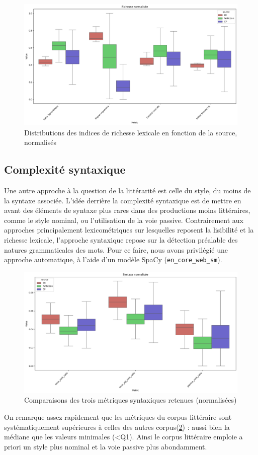 \documentclass[12pt,a4paper,oneside,titlepage]{book} %
\begin{document}
\begin{figure}
    \centering
    \includegraphics[width=0.5\linewidth]{illustration/richness _norm.png}
    \caption{Distributions des indices de richesse lexicale en fonction de la source, normalisés}
    \label{fig:richness_norm}
\end{figure}



\subsection{Complexité syntaxique}

Une autre approche à la question de la littérarité est celle du style, du moins de la syntaxe associée. L'idée derrière la complexité syntaxique est de mettre en avant des éléments de syntaxe plus rares dans des productions moins littéraires, comme le style nominal, ou l'utilisation de la voie passive. 
Contrairement aux approches principalement lexicométriques sur lesquelles reposent la lisibilité et la richesse lexicale, l'approche syntaxique repose sur la détection préalable des natures grammaticales des mots. Pour ce faire, nous avons privilégié une approche automatique, à l'aide d'un modèle SpaCy (\texttt{en\_core\_web\_sm}). 

\begin{figure}
    \centering
    \includegraphics[width=0.5\linewidth]{illustration/synt_norm.png}
    \caption{Comparaisons des trois métriques syntaxiques retenues (normalisées)}
    \label{fig:complexe_norm}
\end{figure}
On remarque assez rapidement que les métriques du corpus littéraire sont systématiquement supérieures à celles des autres corpus(\ref{fig:complexe_norm}) : aussi bien la médiane que les valeurs minimales  (<Q1). Ainsi le corpus littéraire emploie a priori un style plus nominal et la voie passive plus abondamment. 
\end{document}
